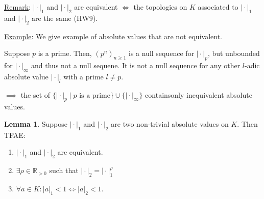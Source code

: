 \documentclass[openany]{amsbook}
\numberwithin{section}{chapter}
\theoremstyle{definition}
\newtheorem{lemma}[theorem]{Lemma}
\begin{document}
\underline{Remark}: \(\vert \cdot \vert_1\) and \(\vert \cdot \vert_2\) are equivalent \(\iff\) the topologies on \(K\) associated to \(\vert \cdot \vert _1\) and \(\vert \cdot \vert _2\) are the same (HW9).

\underline{Example}: We give example of absolute values that are not equivalent.

Suppose \(p\) is a prime. Then, \((p^n)_{n \geq 1}\) is a null sequence for \(\vert \cdot \vert_p\), but unbounded for \(\vert \cdot \vert _ \infty \) and thus not a null sequene. It is not a null sequence for any other \(l\)-adic absolute value \(\vert \cdot \vert _l\) with a prime \(l \neq p\).

\(\implies\) the set of \(\{ \vert \cdot \vert_p \mid p \text{ is a prime} \} \cup \{ \vert \cdot \vert _\infty  \} \) containsonly inequivalent absolute values.

\begin{lemma}
    Suppose \(\vert \cdot \vert _1\) and \(\vert \cdot \vert _2\) are two non-trivial absolute values on \(K\). Then TFAE:

    \begin{enumerate}[label=\roman*)]
        \item \(\vert \cdot \vert _1\) and \(\vert \cdot \vert _2\) are equivalent.
        
        \item \(\exists \rho \in \mathbb{R}_{>0}\) such that \(\vert \cdot \vert _2 = \vert \cdot \vert _1^{\rho} \) 
        \item \(\forall a\in K: \vert a \vert_1 < 1 \iff \vert a \vert _2 < 1\).
    \end{enumerate} 
\end{lemma}
\end{document}
